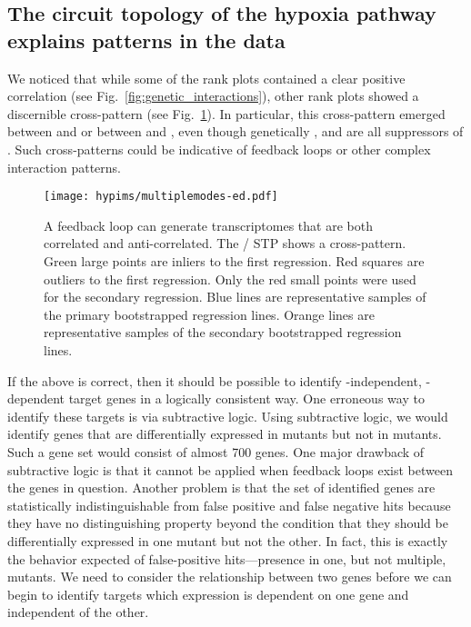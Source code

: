 \subsection*{The circuit topology of the hypoxia pathway explains patterns in
            the data}
\label{sub:topology}
We noticed that while some of the rank plots contained a clear positive correlation
(see Fig.~\ref{fig:genetic_interactions}), other rank plots showed
a discernible cross-pattern (see Fig.~\ref{fig:xpattern}). In particular, this
cross-pattern emerged between \vhl{} and \rhy{} or between \vhl{} and \egl{},
even though genetically ,  and  are all
suppressors of \hif{}. Such cross-patterns could be indicative of feedback loops
or other complex interaction patterns.

\begin{figure}[tbhp]
\centering
\texttt{[image: hypims/multiplemodes-ed.pdf]}
\caption{
A feedback loop can generate transcriptomes that are both
correlated and anti-correlated. The \vhl{}/\rhy{} STP shows a cross-pattern.
Green large points are inliers to the first
regression. Red squares are outliers to the first regression. Only the red
small points were used for the secondary regression. Blue lines are representative
samples of the primary bootstrapped regression lines. Orange lines are
representative samples of the secondary bootstrapped regression lines.
}
\label{fig:xpattern}
\end{figure}



If the above is correct, then it should be possible to identify
-independent, -dependent target genes in a
logically consistent way.
One erroneous way to identify these targets is via
subtractive logic. Using subtractive logic, we would identify genes that are
differentially expressed in \rhy{} mutants but not in \egl{} mutants.  Such a
gene set would
consist of almost 700 genes. One major drawback of subtractive logic is that it
cannot be applied when feedback loops exist between the genes in question.
Another problem is that the set of identified genes are statistically indistinguishable
from false positive and false negative hits because they have no distinguishing
property beyond the condition that they should be differentially expressed in
one mutant but not the other. In fact, this is exactly the behavior expected of
false-positive hits---presence in one, but not multiple, mutants.
We need to consider the relationship between two genes before we can begin to
identify targets which expression is dependent on one gene and independent
of the other.

